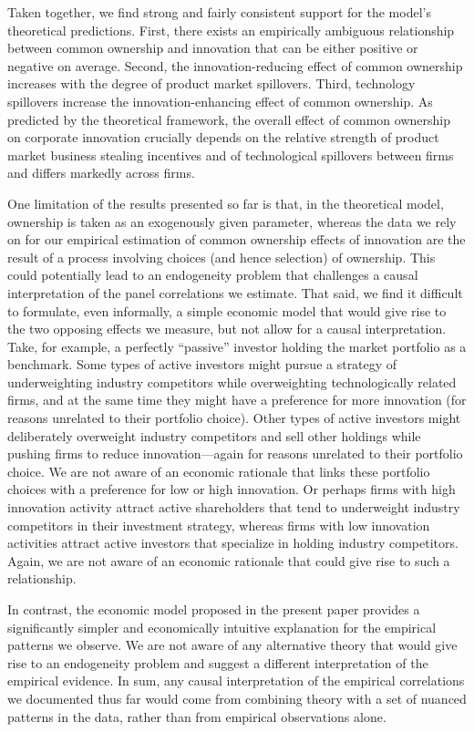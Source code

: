 \documentclass[12pt]{article}
\begin{document}
Taken together, we find strong and fairly consistent support for the model's theoretical predictions. First, there exists an empirically ambiguous relationship between common ownership and innovation that can be either positive or negative on average. Second, the innovation-reducing effect of common ownership increases with the degree of product market spillovers. Third, technology spillovers increase the innovation-enhancing effect of common ownership. As predicted by the theoretical framework, the overall effect of common ownership on corporate innovation crucially depends on the relative strength of product market business stealing incentives and of technological spillovers between firms and differs markedly across firms. 

One limitation of the results presented so far is that, in the theoretical model, ownership is taken as an exogenously given parameter, whereas the data we rely on for our empirical estimation of common ownership effects of innovation are the result of a process involving choices (and hence selection) of ownership. This could potentially lead to an endogeneity problem that challenges a causal interpretation of the panel correlations we estimate. That said, we find it difficult to formulate, even informally, a simple economic model that would give rise to the two opposing effects we measure, but not allow for a causal interpretation. Take, for example, a perfectly ``passive'' investor holding the market portfolio as a benchmark. Some types of active investors might pursue a strategy of underweighting industry competitors while overweighting technologically related firms, and at the same time they might have a preference for more innovation (for reasons unrelated to their portfolio choice). Other types of active investors might deliberately overweight industry competitors and sell other holdings while pushing firms to reduce innovation---again for reasons unrelated to their portfolio choice. We are not aware of an economic rationale that links these portfolio choices with a preference for low or high innovation. Or perhaps firms with high innovation activity attract active shareholders that tend to underweight industry competitors in their investment strategy, whereas firms with low innovation activities attract active investors that specialize in holding industry competitors. Again, we are not aware of an economic rationale that could give rise to such a relationship. 

In contrast, the economic model proposed in the present paper provides a significantly simpler and economically intuitive explanation for the empirical patterns we observe. We are not aware of any alternative theory that would give rise to an endogeneity problem and suggest a different interpretation of the empirical evidence. In sum, any causal interpretation of the empirical correlations we documented thus far would come from combining theory with a set of nuanced patterns in the data, rather than from empirical observations alone.
\end{document}
